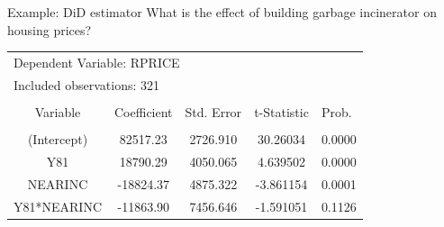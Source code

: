 \documentclass{beamer}
\begin{document}
\begin{frame}{Example: DiD estimator}
\footnotesize{What is the effect of building garbage incinerator on housing prices?}
\scriptsize
\begin{table}[]
\centering
\label{Tab21}
\begin{tabular}{lclcc}
\multicolumn{3}{l}{Dependent Variable: RPRICE}                                          &                      & \multicolumn{1}{l}{}      \\
\multicolumn{3}{l}{Included observations: 321}                                          &                      & \multicolumn{1}{l}{}      \\
                                &                      & \multicolumn{1}{c}{}           &                      & \multicolumn{1}{l}{}      \\
\multicolumn{1}{c}{Variable}    & Coefficient          & \multicolumn{1}{c}{Std. Error} & t-Statistic          & \multicolumn{1}{l}{Prob.} \\
                                
                                & \multicolumn{1}{l}{} &                                & \multicolumn{1}{l}{} & \multicolumn{1}{l}{}      \\
\multicolumn{1}{c}{(Intercept)}           & 82517.23             & \multicolumn{1}{c}{2726.910}   & 30.26034             & 0.0000                    \\
\multicolumn{1}{c}{Y81}         & 18790.29             & \multicolumn{1}{c}{4050.065}   & 4.639502             & 0.0000                    \\
\multicolumn{1}{c}{NEARINC}     & -18824.37            & \multicolumn{1}{c}{4875.322}   & -3.861154            & 0.0001                    \\
\multicolumn{1}{c}{Y81*NEARINC} & -11863.90            & \multicolumn{1}{c}{7456.646}   & -1.591051            & 0.1126                    \\
                                

\end{tabular}
\end{table}
\end{frame}
\end{document}

